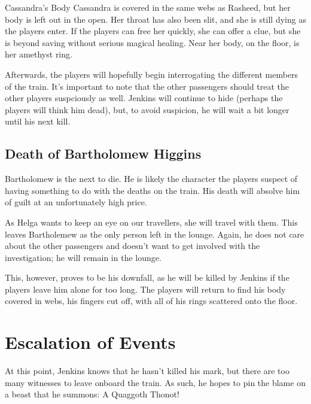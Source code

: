 \documentclass[letterpaper,10pt,twoside,twocolumn,openany]{dndbook}
\begin{document}
\begin{paperbox}{Cassandra's Body}
  Cassandra is covered in the same webs as Rasheed, but her body is left out in the open.  Her throat has also been slit, and she is still dying as the players enter.  If the players can free her quickly, she can offer a clue, but she is beyond saving without serious magical healing.  Near her body, on the floor, is her amethyst ring.
\end{paperbox}

Afterwards, the players will hopefully begin interrogating the different members of the train.  It's important to note that the other passengers should treat the other players suspciously as well.  Jenkins will continue to hide (perhaps the players will think him dead), but, to avoid suspicion, he will wait a bit longer until his next kill.

\subsection{Death of Bartholomew Higgins}
Bartholomew is the next to die.  He is likely the character the players suspect of having something to do with the deaths on the train.  His death will absolve him of guilt at an unfortunately high price.

As Helga wants to keep an eye on our travellers, she will travel with them.  This leaves Bartholemew as the only person left in the lounge.  Again, he does not care about the other passengers and doesn't want to get involved with the investigation; he will remain in the lounge.

This, however, proves to be his downfall, as he will be killed by Jenkins if the players leave him alone for too long.  The players will return to find his body covered in webs, his fingers cut off, with all of his rings scattered onto the floor.

\section{Escalation of Events}
At this point, Jenkins knows that he hasn't killed his mark, but there are too many witnesses to leave onboard the train.  As such, he hopes to pin the blame on a beast that he summons: A Quaggoth Thonot!
\end{document}
